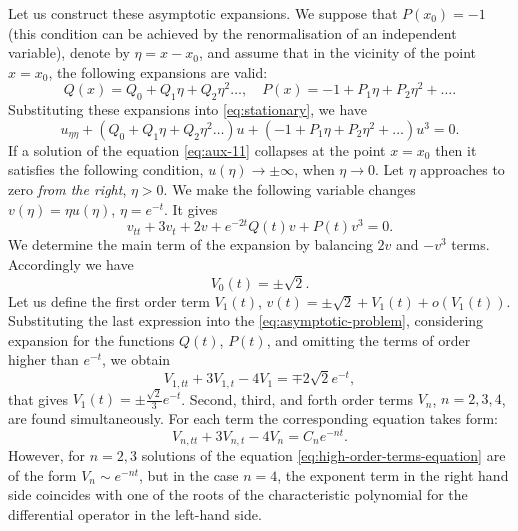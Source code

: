 Let us construct these asymptotic expansions.
We suppose that $P(x_0) = -1$ (this condition can be achieved by the renormalisation of an independent variable), denote by $\eta = x - x_0$, and assume that in the vicinity of the point $x = x_0$, the following expansions are valid:
\begin{equation}
	Q(x) = Q_0 + Q_1 \eta + Q_2 \eta^2 \dots, \quad P(x) = -1 + P_1 \eta + P_2 \eta^2 + \dots.
\end{equation}
Substituting these expansions into \eqref{eq:stationary}, we have
\begin{equation}
	u_{\eta\eta} + (Q_0 + Q_1 \eta + Q_2 \eta^2 \dots)u + (-1 + P_1 \eta + P_2 \eta^2 + \dots) u^3 = 0.
	\label{eq:aux-11}
\end{equation}
If a solution of the equation \eqref{eq:aux-11} collapses at the point $x = x_0$ then it satisfies the following condition, $u(\eta) \to \pm \infty$, when $\eta \to 0$.
Let $\eta$ approaches to zero {\it from the right}, $\eta > 0$.
We make the following variable changes $v(\eta) = \eta u(\eta)$, $\eta = e^{-t}$.
It gives
\begin{equation}
	v_{tt} + 3v_{t} + 2v + e^{-2t} Q(t) v + P(t) v^3 = 0.
	\label{eq:asymptotic-problem}
\end{equation}
We determine the main term of the expansion by balancing $2v$ and $-v^3$ terms.
Accordingly we have
\begin{equation}
	V_0(t) = \pm \sqrt{2}.
	\label{eq:main-term}
\end{equation}
Let us define the first order term $V_1(t)$, $v(t) = \pm \sqrt{2} + V_1(t) + o(V_1(t))$.
Substituting the last expression into the \eqref{eq:asymptotic-problem}, considering expansion for the functions $Q(t)$, $P(t)$, and omitting the terms of order higher than $e^{-t}$, we obtain
\begin{equation}
	V_{1, tt} + 3V_{1, t} - 4V_1 = \mp 2 \sqrt{2} e^{-t},
\end{equation}
that gives $V_1(t) = \pm \frac{\sqrt{2}}{3} e^{-t}$.
Second, third, and forth order terms $V_n$, $n = 2, 3, 4$, are found simultaneously.
For each term the corresponding equation takes form:
\begin{equation}
	V_{n, tt} + 3V_{n, t} - 4V_n = C_n e^{-nt}.
	\label{eq:high-order-terms-equation}
\end{equation}
However, for $n = 2, 3$ solutions of the equation \eqref{eq:high-order-terms-equation} are of the form $V_n \sim e^{-nt}$, but in the case $n = 4$, the exponent term in the right hand side coincides with one of the roots of the characteristic polynomial for the differential operator in the left-hand side.
